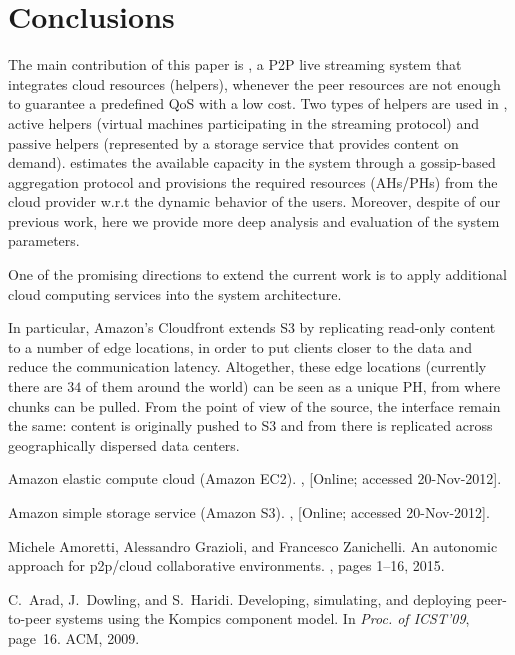 {\section{Conclusions} \label{sec:conclusion}

The main contribution of this paper is \clive, a P2P live streaming system
that integrates cloud resources (helpers), whenever the peer resources are not
enough to guarantee a predefined QoS with a low cost. Two types of helpers are
used in \clive, active helpers (virtual machines participating in the streaming
protocol) and passive helpers (represented by a storage service that
provides content on demand). \clive estimates the available capacity in the
system through a gossip-based aggregation protocol and provisions the required
resources (AHs/PHs) from the cloud provider w.r.t the dynamic behavior of the
users.
%
Moreover, despite of our previous \clive work, here we provide more deep analysis
and evaluation of the system parameters.

One of the promising directions to extend the current work is to apply 
additional cloud computing services into the system architecture.

In particular, Amazon's Cloudfront extends S3 by
replicating read-only content to a number of edge locations, in order
to put clients closer to the data and reduce the communication latency.
Altogether, these edge locations (currently there are $34$ of them around the
world) can be seen as a unique PH, from where chunks can be pulled. From the
point of view of the source, the interface remain the same: content is
originally pushed to S3 and from there is replicated across geographically
dispersed data centers.


%
\begin{thebibliography}{5}

Amazon elastic compute cloud ({Amazon EC2}).
, [Online; accessed 20-Nov-2012].

Amazon simple storage service ({Amazon S3}).
, [Online; accessed 20-Nov-2012].

Michele Amoretti, Alessandro Grazioli, and Francesco Zanichelli.
\newblock An autonomic approach for p2p/cloud collaborative environments.
, pages 1--16, 2015.

C.~Arad, J.~Dowling, and S.~Haridi.
\newblock Developing, simulating, and deploying peer-to-peer systems using the
  {Kompics} component model.
\newblock In {\em Proc. of ICST'09}, page~16. ACM, 2009.


\end{thebibliography}}
